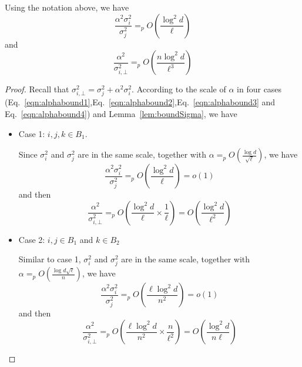 \begin{corollary}\label{cor:alphasigma}
Using the notation above, we have
\begin{equation}
   \frac{\alpha^2 \sigma^2_i}{\sigma^2_j} =_p O\left(\frac{\log^2 d}{\ell} \right)
\end{equation}
and
\begin{equation}
    \frac{\alpha^2}{\sigma^2_{i,\bot}} =_p O\left(\frac{n \log^2 d}{\ell^{3}}\right)
\end{equation}
\end{corollary}

\begin{proof}

Recall that $\sigma^2_{i,\bot} = \sigma^2_j + \alpha^2 \sigma^2_i$.
According to the scale of $\alpha$ in four cases (Eq.~\ref{eqn:alphabound1},Eq.~\ref{eqn:alphabound2},Eq.~\ref{eqn:alphabound3} and Eq.~\ref{eqn:alphabound4}) and Lemma~\ref{lem:boundSigma}, we have
\begin{itemize}
    \item Case 1: $i,j,k \in B_1$.
    
    Since $\sigma^2_i$ and $\sigma^2_j$ are in the same scale, together with $\alpha =_p O\left(\frac{\log d }{\sqrt{\ell}} \right)$, we have
    \begin{equation}
        \frac{\alpha^2 \sigma^2_i}{\sigma^2_j} =_p O\left(\frac{\log^2 d}{\ell} \right) = o(1)
    \end{equation}
    and then
    \begin{equation}
        \frac{\alpha^2}{\sigma^2_{i,\bot}} =_p O\left(\frac{\log^2 d }{\ell} \times \frac{1}{\ell} \right) = O\left(\frac{\log^2 d }{\ell^{2}} \right) 
    \end{equation}
    
    \item Case 2: $i,j \in B_1$ and $k \in B_2$
    
    Similar to case 1, $\sigma^2_i$ and $\sigma^2_j$ are in the same scale, together with $\alpha =_p O\left(\frac{\log d \sqrt{\ell}}{n} \right)$, we have
    \begin{equation}
        \frac{\alpha^2 \sigma^2_i}{\sigma^2_j} =_p O\left(\frac{\ell \log^2 d }{n^2} \right) = o(1)
    \end{equation}
    and then
    \begin{equation}
        \frac{\alpha^2}{\sigma^2_{i,\bot}} =_p O\left(\frac{\ell \log^2 d }{n^2} \times \frac{n}{\ell^2}\right) =O\left(\frac{\log^2 d }{n \ell} \right)
    \end{equation}
    

\end{itemize}
\end{proof}
